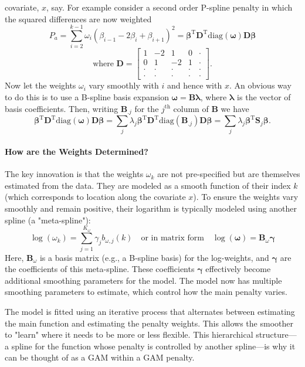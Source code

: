 \documentclass[11pt, a4paper]{article}
\begin{document}
covariate, $x$, say. For example consider a second order P-spline penalty in which the squared differences are now weighted
$$
P_a = \sum_{i=2}^{k-1} \omega_i(\beta_{i-1} - 2\beta_i + \beta_{i+1})^2 = \boldsymbol{\beta}^\mathrm{T} \mathbf{D}^\mathrm{T} \mathrm{diag}(\boldsymbol{\omega}) \mathbf{D} \boldsymbol{\beta}
$$
$$
\text{where } \mathbf{D} = \begin{bmatrix}
1 & -2 & 1 & 0 & \cdot \\
0 & 1 & -2 & 1 & \cdot \\
\cdot & \cdot & \cdot & \cdot & \cdot \\
\cdot & \cdot & \cdot & \cdot & \cdot
\end{bmatrix}.
$$
Now let the weights $\omega_i$ vary smoothly with $i$ and hence with $x$. An obvious way to do this is to use a B-spline basis expansion $\boldsymbol{\omega} = \mathbf{B\lambda}$, where $\boldsymbol{\lambda}$ is the vector of basis coefficients. Then, writing $\mathbf{B}_{.j}$ for the $j^\text{th}$ column of $\mathbf{B}$ we have
$$
\boldsymbol{\beta}^\mathrm{T} \mathbf{D}^\mathrm{T} \mathrm{diag}(\boldsymbol{\omega}) \mathbf{D} \boldsymbol{\beta} = \sum_j \lambda_j \boldsymbol{\beta}^\mathrm{T} \mathbf{D}^\mathrm{T} \mathrm{diag}(\mathbf{B}_{.j}) \mathbf{D} \boldsymbol{\beta} = \sum_j \lambda_j \boldsymbol{\beta}^\mathrm{T} \mathbf{S}_j \boldsymbol{\beta}.
$$

\paragraph{How are the Weights Determined?}
The key innovation is that the weights $\omega_k$ are not pre-specified but are themselves estimated from the data. They are modeled as a smooth function of their index $k$ (which corresponds to location along the covariate $x$). To ensure the weights vary smoothly and remain positive, their logarithm is typically modeled using another spline (a "meta-spline"):
\[ \log(\omega_k) = \sum_{j=1}^{K_{\omega}} \gamma_j b_{\omega,j}(k) \quad \text{or in matrix form} \quad \log(\boldsymbol{\omega}) = \mathbf{B}_{\omega}\boldsymbol{\gamma} \]
Here, $\mathbf{B}_{\omega}$ is a basis matrix (e.g., a B-spline basis) for the log-weights, and $\boldsymbol{\gamma}$ are the coefficients of this meta-spline. These coefficients $\boldsymbol{\gamma}$ effectively become additional smoothing parameters for the model. The model now has multiple smoothing parameters to estimate, which control how the main penalty varies.

The model is fitted using an iterative process that alternates between estimating the main function and estimating the penalty weights. This allows the smoother to "learn" where it needs to be more or less flexible. This hierarchical structure—a spline for the function whose penalty is controlled by another spline—is why it can be thought of as a GAM within a GAM penalty.
\end{document}
